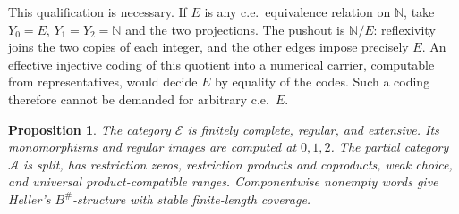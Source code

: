 \documentclass[11pt]{article}
\newtheorem{proposition}[theorem]{Proposition}
\newcommand{\N}{\mathbb N}
\newcommand{\E}{\mathscr E}
\newcommand{\A}{\mathscr A}
\begin{document}
This qualification is necessary. If $E$ is any c.e.\ equivalence
relation on $\N$, take $Y_0=E$, $Y_1=Y_2=\N$ and the two
projections. The pushout is $\N/E$: reflexivity joins the two
copies of each integer, and the other edges impose precisely $E$.
An effective injective coding of this quotient into a numerical
carrier, computable from representatives, would decide $E$ by
equality of the codes. Such a coding therefore cannot be demanded
for arbitrary c.e.\ $E$.

\begin{proposition}\label{prop:structural}
The category $\E$ is finitely complete, regular, and extensive.
Its monomorphisms and regular images are computed at $0,1,2$.
The partial category $\A$ is split, has restriction zeros,
restriction products and coproducts, weak choice, and universal
product-compatible ranges. Componentwise nonempty words give
Heller's $B^\#$-structure with stable finite-length coverage.
\end{proposition}
\end{document}
